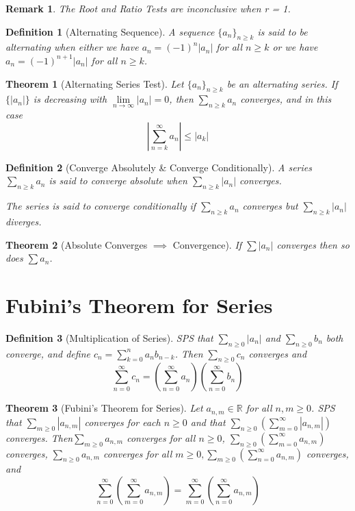 \documentclass[11pt, oneside]{book}
\theoremstyle{break}
\newtheorem{thm}{Theorem}[section]
\newtheorem*{remark}{Remark}
\newtheorem{defn}{Definition}[section]
\newcommand{\bb}[1]{\mathbb{#1}}			%
\begin{document}
\begin{remark}
	The Root and Ratio Tests are inconclusive when r = 1.
\end{remark}

\begin{defn}[Alternating Sequence]
	A sequence $\{a_n\}_{n \geq k}$ is said to be alternating when either we have $a_n = (-1)^n|a_n|$ for all $n \geq k$ or we have $a_n = (-1)^{n + 1}|a_n|$ for all $n \geq k$.
\end{defn}

\begin{thm}[Alternating Series Test]
	Let $\{a_n\}_{n \geq k}$ be an alternating series. If $\{|a_n|\}$ is decreasing with $\lim\limits_{n \to \infty} |a_n| = 0$, then $\sum_{n \geq k} a_n$ converges, and in this case
	\[
		\left| \sum_{n=k}^{\infty} a_n \right| \leq |a_k|
	\]
\end{thm}

\begin{defn}[Converge Absolutely \& Converge Conditionally]
	A series $\sum_{n \geq k} a_n$ is said to converge absolute when $\sum_{n \geq k} |a_n|$ converges.

	The series is said to converge conditionally if $\sum_{n \geq k} a_n$ converges but $\sum_{n \geq k} |a_n|$ diverges.
\end{defn}

\begin{thm}[Absolute Converges $\implies$ Convergence]
	If $\sum |a_n|$ converges then so does $\sum a_n$.
\end{thm}


\section{Fubini's Theorem for Series}\label{fubinithm_series}
\begin{defn}[Multiplication of Series]\label{series_multiplication}
	SPS that $\sum_{n \geq 0} |a_n|$ and $\sum_{n \geq 0} b_n$ both converge, and define $c_n = \sum\limits_{k = 0}^{n} a_n b_{n - k}$. Then $\sum_{n \geq 0} c_n$ converges and
	\[
		\sum_{n = 0}^{\infty} c_n = \left( \sum_{n = 0}^{\infty} a_n \right) \left(\sum_{n = 0}^{\infty} b_n \right)
	\]
\end{defn}

\begin{thm}[Fubini's Theorem for Series]
	Let $a_{n, m} \in \bb{R}$ for all $n, m \geq 0$. SPS that $\sum_{m \geq 0} |a_{n, m}|$ converges for each $n \geq 0$ and that $\sum\limits_{n \geq 0} \left(\sum\limits_{m = 0}^{\infty} |a_{n, m}| \right)$ converges. Then$\sum_{m \geq 0} a_{n, m}$ converges for all $n \geq 0$, $\sum\limits_{n \geq 0} \left( \sum\limits_{m = 0}^{\infty} a_{n, m} \right)$ converges, $\sum_{n \geq 0} a_{n, m}$ converges for all $m \geq 0, \sum\limits_{m \geq 0} \left(\sum\limits_{n = 0}^{\infty} a_{n, m} \right)$ converges, and
	\[
		\sum_{n = 0}^{\infty} \left(\sum_{m = 0}^{\infty} a_{n, m} \right) = \sum_{m = 0}^{\infty} \left(\sum_{n = 0}^{\infty} a_{n, m} \right)
	\]
\end{thm}
\end{document}
